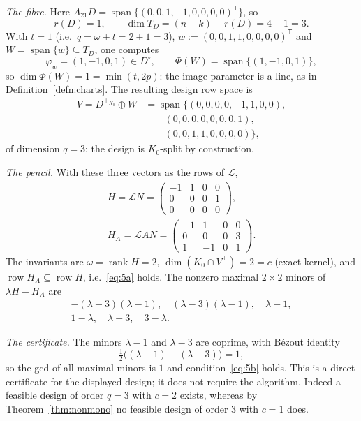 \documentclass[journal]{IEEEtran}
\theoremstyle{plainn}
\theoremstyle{remark}
\newcommand{\row}{\operatorname{row}}
\newcommand{\rank}{\operatorname{rank}}
\begin{document}
\emph{The fibre.} Here $A_{21}D=\operatorname{span}\{(0,0,1,-1,0,0,0,0)^{\mathsf T}\}$, so
\[
r(D)=1,\qquad \dim T_D=(n-k)-r(D)=4-1=3.
\]
With $t=1$ (i.e.\ $q=\omega+t=2+1=3$), $w:=(0,0,1,1,0,0,0,0)^{\mathsf T}$ and
$W=\operatorname{span}\{w\}\subseteq T_D$, one computes
\[
\varphi_w=(1,-1,0,1)\in D^\circ,\qquad \Phi(W)=\operatorname{span}\{(1,-1,0,1)\},
\]
so $\dim\Phi(W)=1=\min(t,2p)$: the image parameter is a line, as in Definition~\ref{defn:charts}. The
resulting design row space is
\[
\begin{aligned}
V=D^{\perp_{K_0}}\oplus W
&=\operatorname{span}\bigl\{(0,0,0,0,-1,1,0,0),\\
&\qquad (0,0,0,0,0,0,0,1),\\
&\qquad (0,0,1,1,0,0,0,0)\bigr\},
\end{aligned}
\]
of dimension $q=3$; the design is $K_0$-split by construction.

\emph{The pencil.} With these three vectors as the rows of $\mathcal L$,
\[
\begin{gathered}
H=\mathcal L N=\begin{pmatrix}-1&1&0&0\\ 0&0&0&1\\ 0&0&0&0\end{pmatrix},\\
H_A=\mathcal L AN=\begin{pmatrix}-1&1&0&0\\ 0&0&0&3\\ 1&-1&0&1\end{pmatrix}.
\end{gathered}
\]
The invariants are $\omega=\rank H=2$, $\dim(K_0\cap V^\perp)=2=c$ (exact kernel), and
$\row H_A\subseteq\row H$, i.e.\ \eqref{eq:5a} holds. The nonzero maximal $2\times2$ minors of
$\lambda H-H_A$ are
\[
\begin{gathered}
-(\lambda-3)(\lambda-1),\quad (\lambda-3)(\lambda-1),\quad \lambda-1,\\
1-\lambda,\quad \lambda-3,\quad 3-\lambda .
\end{gathered}
\]

\emph{The certificate.} The minors $\lambda-1$ and $\lambda-3$ are coprime, with Bézout identity
\[
\tfrac12\bigl((\lambda-1)-(\lambda-3)\bigr)=1 ,
\]
so the gcd of all maximal minors is $1$ and condition~\eqref{eq:5b} holds. This is a direct
certificate for the displayed design; it does not require the algorithm. Indeed a feasible design of
order $q=3$ with $c=2$ exists, whereas by Theorem~\ref{thm:nonmono} no feasible design of order $3$
with $c=1$ does.
\end{document}
